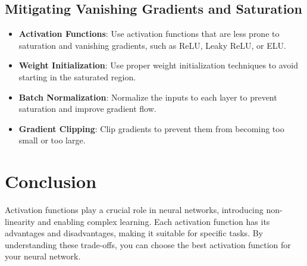 \begin{notechapter}
\subsection{Mitigating Vanishing Gradients and Saturation}
\begin{itemize}[leftmargin=*]
    \item \textbf{Activation Functions}: Use activation functions that are less prone
    to saturation and vanishing gradients, such as ReLU, Leaky ReLU, or ELU.
    \item \textbf{Weight Initialization}: Use proper weight initialization techniques
    to avoid starting in the saturated region.
    \item \textbf{Batch Normalization}: Normalize the inputs to each layer to prevent
    saturation and improve gradient flow.
    \item \textbf{Gradient Clipping}: Clip gradients to prevent them from becoming
    too small or too large.
\end{itemize}

\section{Conclusion}
Activation functions play a crucial role in neural networks, introducing
non-linearity and enabling complex learning. Each activation function has its
advantages and disadvantages, making it suitable for specific tasks. By
understanding these trade-offs, you can choose the best activation function for
your neural network.
\end{notechapter}
